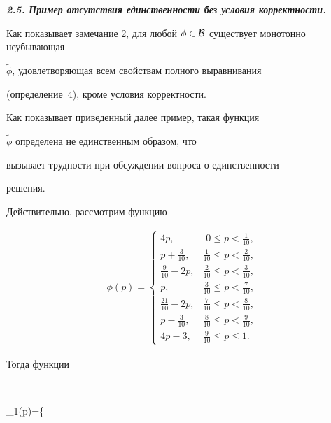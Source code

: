 \smallskip



{\bf \itshape 2.5. Пример отсутствия единственности без условия корректности.}

Как показывает замечание \hyperlink{palin:remark2}{2}, для любой $\phi\in{\cal B}$ существует монотонно неубывающая

$\widetilde{\phi}$, удовлетворяющая всем свойствам полного выравнивания 

(определение~\hyperlink{palin:definition4}{4}), кроме условия корректности.

Как показывает приведенный далее пример, такая функция

$\widetilde{\phi}$ определена не единственным образом, что

вызывает трудности при обсуждении вопроса о единственности

решения. 



Действительно, рассмотрим функцию

\begin{gather}

\phi(p)=\left\{

\begin{array}{cl}

4p, & \,\,0\le p<\frac{1}{10},\\[2mm]

p+\frac{3}{10}, &\frac{1}{10}\le p<\frac{2}{10},\\[2mm]

\frac{9}{10}-2p,& \frac{2}{10}\le p<\frac{3}{10},\\[2mm]

p,&\frac{3}{10}\le p<\frac{7}{10},\\[2mm]

\frac{21}{10}-2p,&\frac{7}{10}\le p<\frac{8}{10},\\[2mm]

p-\frac{3}{10}, &\frac{8}{10}\le p<\frac{9}{10},\\[2mm]

4p-3,&\frac{9}{10}\le p\le1.

\end{array}\right.

\label{eq-counterexample-phi}

\end{gather}

Тогда функции

$$

\psi_1(p)=\left\{

